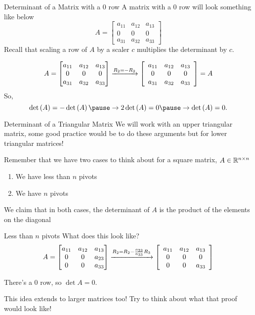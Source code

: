 \documentclass[xcoler=dvipsnames, aspectratio=169]{beamer}
\begin{document}
    \begin{frame}{Determinant of a Matrix with a 0 row}
        A matrix with a $0$ row will look something like below
        \[
            A = \begin{bmatrix}
                a_{11} & a_{12} & a_{13} \\
                0 & 0 & 0\\
                a_{31} & a_{32} & a_{33}
            \end{bmatrix}
        \]\pause
        Recall that scaling a row of $A$ by a scaler $c$ multiplies the determinant by $c$.
        \pause

        \[
            A = \begin{bmatrix}
                a_{11} & a_{12} & a_{13} \\
                0 & 0 & 0\\
                a_{31} & a_{32} & a_{33}
            \end{bmatrix}\xrightarrow{R_2 = -R_2}\aMat{ccc}{
                a_{11} & a_{12} & a_{13} \\
                0 & 0 & 0\\
                a_{31} & a_{32} & a_{33}
            } = A
        \]
        \pause
        So,
        \[
            \det{A} = -\det{A}\pause\rightarrow 2\det{A} = 0\pause\rightarrow \det{A} = 0.
        \]
    \end{frame}
    \begin{frame}{Determinant of a Triangular Matrix}
        We will work with an upper triangular matrix, some good practice would be to 
        do these arguments but for lower triangular matrices!\pause

        Remember that we have two cases to think about for a square matrix, $A\in\R^{n\times n}$
        \begin{enumerate}
            \pause\item We have less than $n$ pivots
            \pause\item We have $n$ pivots
        \end{enumerate}\pause
        We claim that in both cases, the determinant of $A$ is the product of the elements
        on the diagonal
    \end{frame}
    \begin{frame}{Less than $n$ pivots}
        What does this look like?\pause
        \[
            A = \begin{bmatrix}
                a_{11} & a_{12} & a_{13}\\
                0 & 0 & a_{23}\\
                0 & 0 & a_{33}
            \end{bmatrix}\xrightarrow{R_2=R_2 - \frac{a_{23}}{a_{33}}R_3}\aMat{ccc}{
                a_{11} & a_{12} & a_{13}\\
                0 & 0 & 0\\
                0 & 0 & a_{33}
            }
        \]
        \pause

        There's a 0 row, so $\det{A} = 0$.\pause

        This idea extends to larger matrices too! Try to think about what that proof 
        would look like!
    \end{frame}
\end{document}
